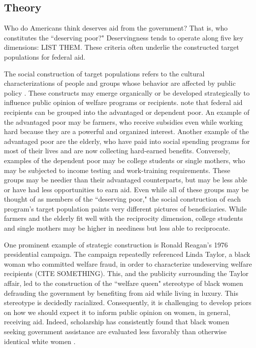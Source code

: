 \documentclass[12pt]{article}%
\begin{document}
\begin{doublespace}
\section*{Theory}
Who do Americans think deserves aid from the government? That is, who constitutes the ``deserving poor?" Deservingness tends to operate along five key dimensions: LIST THEM. These criteria often underlie the constructed target populations for federal aid.


The social construction of target populations refers to the cultural characterizations of people and groups whose behavior are affected by public policy \citep{schneider_social_1993}. These constructs may emerge organically or be developed strategically to influence public opinion of welfare programs or recipients. \cite{schneider_social_1993} note that federal aid recipients can be grouped into the advantaged or dependent poor. An example of the advantaged poor may be farmers, who receive subsidies even while working hard because they are a powerful and organized interest. Another example of the advantaged poor are the elderly, who have paid into social spending programs for most of their lives and are now collecting hard-earned benefits. Conversely, examples of the dependent poor may be college students or single mothers, who may be subjected to income testing and work-training requirements. These groups may be needier than their advantaged counterparts, but may be less able or have had less opportunities to earn aid. Even while all of these groups may be thought of as members of the ``deserving poor," the social construction of each program's target population paints very different pictures of beneficiaries. While farmers and the elderly fit well with the reciprocity dimension, college students and single mothers may be higher in neediness but less able to reciprocate.

One prominent example of strategic construction is Ronald Reagan's 1976 presidential campaign. The campaign repeatedly referenced Linda Taylor, a black woman who committed welfare fraud, in order to characterize undeserving welfare recipients (CITE SOMETHING). This, and the publicity surrounding the Taylor affair, led to the construction of the ``welfare queen" stereotype of black women defrauding the government by benefiting from aid while living in luxury. This stereotype is decidedly racialized. Consequently, it is challenging to develop priors on how we should expect it to inform public opinion on women, in general, receiving aid. Indeed, scholarship has consistently found that black women seeking government assistance are evaluated less favorably than otherwise identical white women \citep{gilliam_welfare_1999, desante_working_2013, hayes_2020}.


\end{doublespace}
\end{document}
